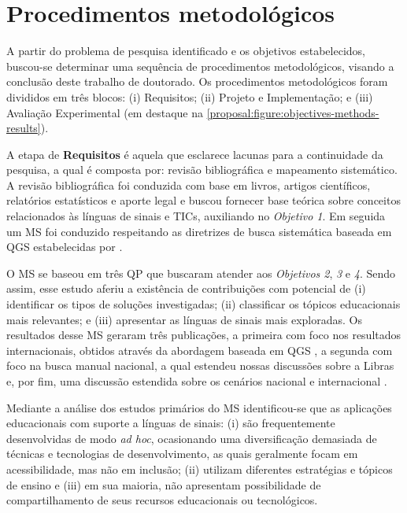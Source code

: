 \section{Procedimentos metodológicos}

A partir do problema de pesquisa identificado e os objetivos estabelecidos, buscou-se determinar uma sequência de procedimentos metodológicos, visando a conclusão deste trabalho de doutorado. Os procedimentos metodológicos foram divididos em três blocos: (i) Requisitos; (ii) Projeto e Implementação; e (iii) Avaliação Experimental (em destaque na \autoref{proposal:figure:objectives-methods-results}).

A etapa de \textbf{Requisitos} é aquela que esclarece lacunas para a continuidade da pesquisa, a qual é composta por: revisão bibliográfica e mapeamento sistemático. A revisão bibliográfica foi conduzida com base em livros, artigos científicos, relatórios estatísticos e aporte legal \cite{Gil2016} e buscou fornecer base teórica sobre conceitos relacionados às línguas de sinais e TICs, auxiliando no \textit{Objetivo 1}. Em seguida um MS foi conduzido respeitando as diretrizes de busca sistemática baseada em QGS estabelecidas por .

O MS se baseou em três QP que buscaram atender aos \textit{Objetivos 2}, \textit{3} e \textit{4}. Sendo assim, esse estudo aferiu a existência de contribuições com potencial de (i) identificar os tipos de soluções investigadas; (ii) classificar os tópicos educacionais mais relevantes; e (iii) apresentar as línguas de sinais mais exploradas. Os resultados desse MS geraram três publicações, a primeira com foco nos resultados internacionais, obtidos através da abordagem baseada em QGS \cite{FalvoJr2020_FIE}, a segunda com foco na busca manual nacional, a qual estendeu nossas discussões sobre a Libras \cite{FalvoJr2020_SBIE} e, por fim, uma discussão estendida sobre os cenários nacional e internacional \cite{FalvoJr2020_RENOTE}.

Mediante a análise dos estudos primários do MS identificou-se que as aplicações educacionais com suporte a línguas de sinais: (i) são frequentemente desenvolvidas de modo \textit{ad hoc}, ocasionando uma diversificação demasiada de técnicas e tecnologias de desenvolvimento, as quais geralmente focam em acessibilidade, mas não em inclusão; (ii) utilizam diferentes estratégias e tópicos de ensino e (iii) em sua maioria, não apresentam possibilidade de compartilhamento de seus recursos educacionais ou tecnológicos. 

